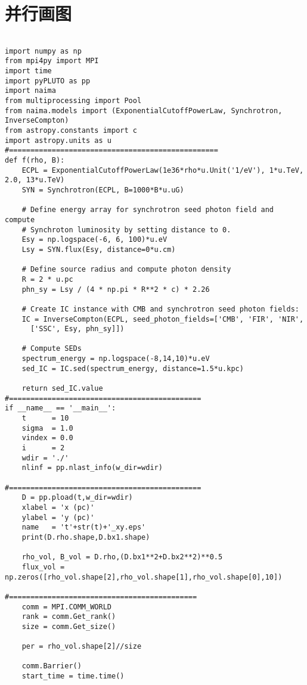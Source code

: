 \section{并行画图}
\label{mpi4py}

\begin{lstlisting}

import numpy as np
from mpi4py import MPI
import time
import pyPLUTO as pp
import naima
from multiprocessing import Pool
from naima.models import (ExponentialCutoffPowerLaw, Synchrotron, InverseCompton)
from astropy.constants import c
import astropy.units as u
#=================================================
def f(rho, B):
    ECPL = ExponentialCutoffPowerLaw(1e36*rho*u.Unit('1/eV'), 1*u.TeV, 2.0, 13*u.TeV)
    SYN = Synchrotron(ECPL, B=1000*B*u.uG)

    # Define energy array for synchrotron seed photon field and compute
    # Synchroton luminosity by setting distance to 0.
    Esy = np.logspace(-6, 6, 100)*u.eV
    Lsy = SYN.flux(Esy, distance=0*u.cm)

    # Define source radius and compute photon density
    R = 2 * u.pc
    phn_sy = Lsy / (4 * np.pi * R**2 * c) * 2.26

    # Create IC instance with CMB and synchrotron seed photon fields:
    IC = InverseCompton(ECPL, seed_photon_fields=['CMB', 'FIR', 'NIR',
      ['SSC', Esy, phn_sy]])

    # Compute SEDs
    spectrum_energy = np.logspace(-8,14,10)*u.eV
    sed_IC = IC.sed(spectrum_energy, distance=1.5*u.kpc)

    return sed_IC.value
#=============================================
if __name__ == '__main__':
    t      = 10
    sigma  = 1.0
    vindex = 0.0
    i      = 2
    wdir = './'
    nlinf = pp.nlast_info(w_dir=wdir)

#=============================================
    D = pp.pload(t,w_dir=wdir)
    xlabel = 'x (pc)'
    ylabel = 'y (pc)'
    name   = 't'+str(t)+'_xy.eps'
    print(D.rho.shape,D.bx1.shape)

    rho_vol, B_vol = D.rho,(D.bx1**2+D.bx2**2)**0.5
    flux_vol = np.zeros([rho_vol.shape[2],rho_vol.shape[1],rho_vol.shape[0],10])

#============================================
    comm = MPI.COMM_WORLD
    rank = comm.Get_rank()
    size = comm.Get_size()

    per = rho_vol.shape[2]//size

    comm.Barrier()
    start_time = time.time()


\end{lstlisting}
